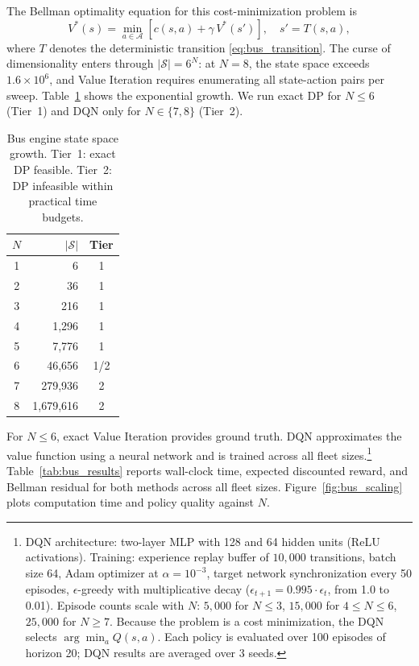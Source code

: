 The Bellman optimality equation for this cost-minimization problem is
\begin{equation}
\label{eq:bus_bellman}
V^*(s) = \min_{a \in \mathcal{A}} \left[ c(s, a) + \gamma \, V^*(s') \right], \quad s' = T(s, a),
\end{equation}
where $T$ denotes the deterministic transition \eqref{eq:bus_transition}. The curse of dimensionality enters through $|\mathcal{S}| = 6^N$: at $N = 8$, the state space exceeds $1.6 \times 10^6$, and Value Iteration requires enumerating all state-action pairs per sweep. Table~\ref{tab:bus_scaling} shows the exponential growth. We run exact DP for $N \leq 6$ (Tier~1) and DQN only for $N \in \{7, 8\}$ (Tier~2).

\begin{table}[h!]
\centering
\caption{Bus engine state space growth. Tier~1: exact DP feasible. Tier~2: DP infeasible within practical time budgets.}
\label{tab:bus_scaling}
\begin{tabular}{crc}
\toprule
$N$ & $|\mathcal{S}|$ & Tier \\
\midrule
1 & 6 & 1 \\
2 & 36 & 1 \\
3 & 216 & 1 \\
4 & 1,296 & 1 \\
5 & 7,776 & 1 \\
6 & 46,656 & 1/2 \\
7 & 279,936 & 2 \\
8 & 1,679,616 & 2 \\
\bottomrule
\end{tabular}
\end{table}

For $N \leq 6$, exact Value Iteration provides ground truth. DQN approximates the value function using a neural network and is trained across all fleet sizes.\footnote{DQN architecture: two-layer MLP with 128 and 64 hidden units (ReLU activations). Training: experience replay buffer of $10{,}000$ transitions, batch size 64, Adam optimizer at $\alpha = 10^{-3}$, target network synchronization every 50 episodes, $\epsilon$-greedy with multiplicative decay ($\epsilon_{t+1} = 0.995 \cdot \epsilon_t$, from 1.0 to 0.01). Episode counts scale with $N$: $5{,}000$ for $N \leq 3$, $15{,}000$ for $4 \leq N \leq 6$, $25{,}000$ for $N \geq 7$. Because the problem is a cost minimization, the DQN selects $\arg\min_a Q(s,a)$. Each policy is evaluated over 100 episodes of horizon 20; DQN results are averaged over 3 seeds.} Table~\ref{tab:bus_results} reports wall-clock time, expected discounted reward, and Bellman residual for both methods across all fleet sizes. Figure~\ref{fig:bus_scaling} plots computation time and policy quality against $N$.

